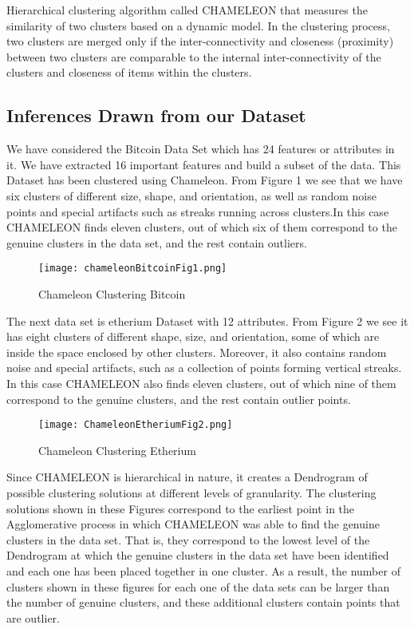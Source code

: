 \documentclass{article}
\begin{document}
Hierarchical clustering algorithm called CHAMELEON that measures the similarity of two clusters based on a dynamic model. In the clustering process, two clusters are merged only if the inter-connectivity and closeness (proximity) between two clusters are comparable to the internal inter-connectivity
of the clusters and closeness of items within the clusters.

\subsection{Inferences Drawn from our Dataset}
We have considered the Bitcoin Data Set which has 24 features or attributes in it. We have extracted 16 important features and build a subset of the data. This Dataset has been clustered using Chameleon. From Figure 1 we see that we have six clusters of different size, shape, and orientation, as well as random noise points and special artifacts such as streaks running across clusters.In this case CHAMELEON finds eleven clusters, out of which six of them correspond to the genuine clusters in the data set, and the rest contain outliers.\newline


\begin{figure}[h]
    \centering
    \texttt{[image: chameleonBitcoinFig1.png]}
    \caption{Chameleon Clustering Bitcoin}
    \label{fig:my_label}
\end{figure}


The next data set is etherium Dataset with 12 attributes. From Figure 2 we see it has eight clusters of different shape, size, and orientation, some of which are inside the space enclosed by other clusters. Moreover, it also contains random noise and special artifacts, such as a collection of points forming vertical streaks. In this case CHAMELEON also finds eleven clusters, out of
which nine of them correspond to the genuine clusters, and the rest contain outlier points.\newline

\begin{figure}[h]
    \centering
    \texttt{[image: ChameleonEtheriumFig2.png]}
    \caption{Chameleon Clustering Etherium}
    \label{fig:my_label}
\end{figure}

Since CHAMELEON is hierarchical in nature, it creates a Dendrogram of possible clustering solutions at different levels of granularity. The clustering solutions shown in these Figures correspond to the earliest point in the Agglomerative process in which CHAMELEON was able to find the genuine clusters in the data set. That is, they correspond to the lowest level of the Dendrogram at which the genuine clusters in the data set have been identified and each one has been
placed together in one cluster. As a result, the number of clusters shown in these figures for each one of the data sets can be larger than the number of genuine clusters, and these additional clusters contain points that are outlier.
\end{document}
